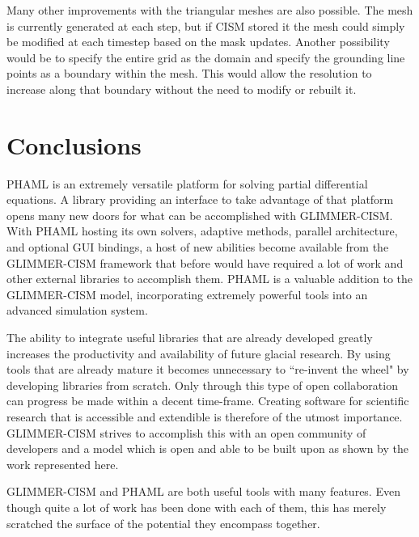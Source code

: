 Many other improvements with the triangular meshes are also possible.  The mesh is currently generated at each step, but if CISM stored it the mesh could simply be modified at each timestep based on the mask updates.  Another possibility would be to specify the entire grid as the domain and specify the grounding line points as a boundary within the mesh.  This would allow the resolution to increase along that boundary without the need to modify or rebuilt it.


\section{Conclusions}\label{sec:chp6conc}
PHAML is an extremely versatile platform for solving partial differential equations.  A library providing an interface to take advantage of that platform opens many new doors for what can be accomplished with GLIMMER-CISM.  With PHAML hosting its own solvers, adaptive methods, parallel architecture, and optional GUI bindings, a host of new abilities become available from the GLIMMER-CISM framework that before would have required a lot of work and other external libraries to accomplish them.  PHAML is a valuable addition to the GLIMMER-CISM model, incorporating extremely powerful tools into an advanced simulation system.


The ability to integrate useful libraries that are already developed greatly increases the productivity and availability of future glacial research.  By using tools that are already mature it becomes unnecessary to ``re-invent the wheel" by developing libraries from scratch.  Only through this type of open collaboration can progress be made within a decent time-frame.  Creating software for scientific research that is accessible and extendible is therefore of the utmost importance.  GLIMMER-CISM strives to accomplish this with an open community of developers and a model which is open and able to be built upon as shown by the work represented here. 
  

GLIMMER-CISM and PHAML are both useful tools with many features.  Even though quite a lot of work has been done with each of them, this has merely scratched the surface of the potential they encompass together.  %




